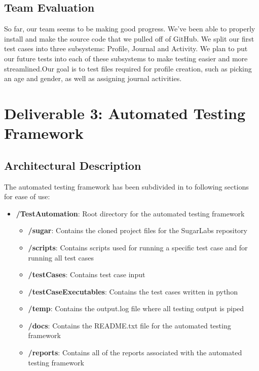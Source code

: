 \documentclass{article}
\begin{document}
\subsection{Team Evaluation}
So far, our team seems to be making good progress. We’ve been able to properly install and make the source code that we pulled off of GitHub. We split our first test cases into three subsystems: Profile, Journal and Activity. We plan to put our future tests into each of these subsystems to make testing easier and more streamlined.Our goal is to test files required for profile creation, such as picking an age and gender, as well as assigning journal activities. 

\section{Deliverable 3: Automated Testing Framework}
\subsection{Architectural Description}
The automated testing framework has been subdivided in to following sections for ease of use:
\begin{itemize}[noitemsep,topsep=0pt]
\item[]\textbf{/TestAutomation}: Root directory for the automated testing framework
\begin{itemize}[noitemsep,topsep=0pt]
\item[]\textbf{/sugar}: Contains the cloned project files for the SugarLabs repository
\item[]\textbf{/scripts}: Contains scripts used for running a specific test case and for running all test cases
\item[]\textbf{/testCases}: Contains test case input
\item[]\textbf{/testCaseExecutables}: Contains the test cases written in python
\item[]\textbf{/temp}: Contains the output.log file where all testing output is piped
\item[]\textbf{/docs}: Contains the README.txt file for the automated testing framework
\item[]\textbf{/reports}: Contains all of the reports associated with the automated testing framework
\end{itemize}
\end{itemize}
\end{document}
